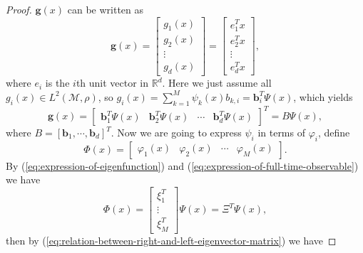\documentclass[en, bibend=bibtex]{elegantpaper}
\theoremstyle{plain}
\begin{document}
\begin{proof}
  $\mathbf{g}(x)$ can be written as
  \begin{equation*}
    \mathbf{g}(x) = \left[
      \begin{array}{c}
        g_1(x)\\
        g_2(x)\\
        \vdots\\
        g_d(x)
      \end{array}
    \right] = \left[
      \begin{array}{c}
        e^T_1x\\
        e^T_2x\\
        \vdots\\
        e^T_dx
      \end{array}
    \right],
  \end{equation*}
  where $e_i$ is the $i$th unit vector in $\mathbb{R}^d$.
  Here we just assume all $g_i(x) \in L^2(\mathcal{M}, \rho)$,
  so $g_i(x) = \sum\limits_{k = 1}^M \psi_k(x) b_{k,i} = \mathbf{b}_i^T \Psi(x)$,
  which yields
  \begin{equation}
    \label{eq:expression-of-full-time-observable}
    \mathbf{g}(x) = \left[
      \begin{array}{cccc}
        \mathbf{b}_1^T\Psi(x)&\mathbf{b}_2^T\Psi(x)&\cdots&\mathbf{b}_d^T\Psi(x)
      \end{array}
    \right]^T
    = B\Psi(x),
  \end{equation}
  where $B = [\mathbf{b}_1,\cdots,\mathbf{b}_d]^T$.
  Now we are going to express $\psi_i$ in terms of $\varphi_i$,
  define
  \begin{equation*}
    \Phi(x) = \left[
      \begin{array}{cccc}
        \varphi_1(x)&\varphi_2(x)&\cdots&\varphi_M(x)
      \end{array}
    \right].
  \end{equation*}
  By (\ref{eq:expression-of-eigenfunction})
  and (\ref{eq:expression-of-full-time-observable})
  we have
  \begin{equation*}
    \Phi(x) = \left[
      \begin{array}{c}
        \xi_1^T\\
        \vdots\\
        \xi_M^T
      \end{array}
    \right] \Psi(x) = \Xi^T \Psi(x),
  \end{equation*}
  then by (\ref{eq:relation-between-right-and-left-eigenvector-matrix})
  we have

\end{proof}
\end{document}
